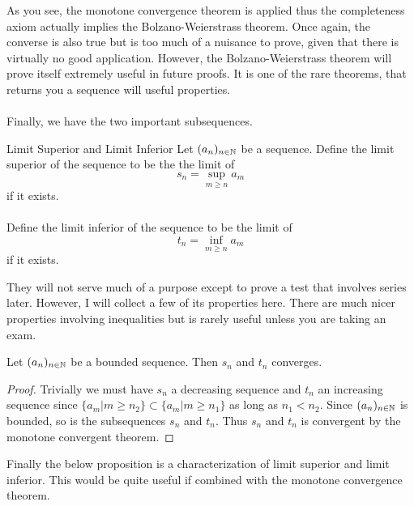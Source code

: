 \documentclass[a4paper]{article}
\begin{document}
As you see, the monotone convergence theorem is applied thus the completeness axiom actually implies the Bolzano-Weierstrass theorem. Once again, the converse is also true but is too much of a nuisance to prove, given that there is virtually no good application. However, the Bolzano-Weierstrass theorem will prove itself extremely useful in future proofs. It is one of the rare theorems, that returns you a sequence will useful properties. \\~\\

Finally, we have the two important subsequences. 

\begin{defn}{Limit Superior and Limit Inferior}{} Let $(a_n)_{n\in\mathbb{N}}$ be a sequence. Define the limit superior of the sequence to be the the limit of $$s_n=\sup_{m\geq n}a_m$$ if it exists. \\~\\ Define the limit inferior of the sequence to be the limit of $$t_n=\inf_{m\geq n}a_m$$ if it exists. 
\end{defn}

They will not serve much of a purpose except to prove a test that involves series later. However, I will collect a few of its properties here. There are much nicer properties involving inequalities but is rarely useful unless you are taking an exam. 

\begin{prp}{}{} Let $(a_n)_{n\in\mathbb{N}}$ be a bounded sequence. Then $s_n$ and $t_n$ converges. \tcbline
\begin{proof}
Trivially we must have $s_n$ a decreasing sequence and $t_n$ an increasing sequence since $\{a_m|m\geq n_2\}\subset\{a_m|m\geq n_1\}$ as long as $n_1<n_2$. Since $(a_n)_{n\in\mathbb{N}}$ is bounded, so is the subsequences $s_n$ and $t_n$. Thus $s_n$ and $t_n$ is convergent by the monotone convergent theorem. 
\end{proof}
\end{prp}

Finally the below proposition is a characterization of limit superior and limit inferior. This would be quite useful if combined with the monotone convergence theorem. 
\end{document}
